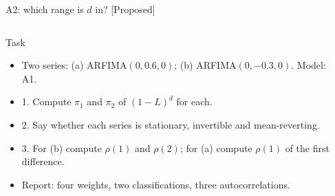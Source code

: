 \begin{frame}{A2: which range is $d$ in? [Proposed]}
\propsub
\itemsize{\scriptsize}
\begin{columns}[T]
\begin{column}{\taskw}
\begin{block}{Task}
\begin{itemize}
    \item Two series: (a) ARFIMA$(0, 0.6, 0)$; (b) ARFIMA$(0, -0.3, 0)$. Model: A1.
    \item 1. Compute $\pi_1$ and $\pi_2$ of $(1-L)^d$ for each.
    \item 2. Say whether each series is stationary, invertible and mean-reverting.
    \item 3. For (b) compute $\rho(1)$ and $\rho(2)$; for (a) compute $\rho(1)$ of the first difference.
    \item Report: four weights, two classifications, three autocorrelations.
\end{itemize}
\end{block}
\end{column}
\begin{column}{\solw}
\end{column}
\end{columns}
\end{frame}

